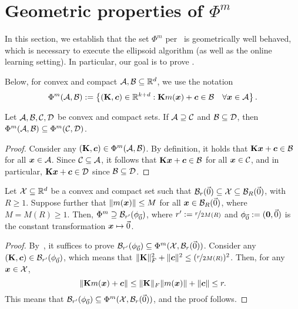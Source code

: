 \section{Geometric properties of $\Phi^m$}
\label{sec:wellbounded}

In this section, we establish that the set $\Phi^m$ per~ is geometrically well behaved, which is necessary to execute the ellipsoid algorithm (as well as the online learning setting). In particular, our goal is to prove .

Below, for convex and compact ${\mathcal{A}}, {\mathcal{B}} \subseteq \mathbb R^d$, we use the notation 
\begin{equation}
    \Phi^m({\mathcal{A}}, {\mathcal{B}}) := \left\{ ({\mathbf{K}}, \bm{c}) \in \mathbb R^{k + d} : {\mathbf{K}} m({\bm{x}}) + \bm{c} \in {\mathcal{B}} \quad \forall {\bm{x}} \in {\mathcal{A}} \right\}.
\end{equation}

\begin{lemma}
    \label{lemma:trivial}
    Let ${\mathcal{A}}, {\mathcal{B}}, {\mathcal{C}}, {\mathcal{D}}$ be convex and compact sets. If ${\mathcal{A}} \supseteq {\mathcal{C}}$ and ${\mathcal{B}} \subseteq {\mathcal{D}}$, then $\Phi^m({\mathcal{A}}, {\mathcal{B}}) \subseteq \Phi^m({\mathcal{C}}, {\mathcal{D}})$.
\end{lemma}

\begin{proof}
    Consider any $({\mathbf{K}}, \bm{c}) \in \Phi^m({\mathcal{A}}, {\mathcal{B}})$. By definition, it holds that ${\mathbf{K}} {\bm{x}} + \bm{c} \in {\mathcal{B}}$ for all ${\bm{x}} \in {\mathcal{A}}$. Since ${\mathcal{C}} \subseteq {\mathcal{A}}$, it follows that ${\mathbf{K}} {\bm{x}} + \bm{c} \in {\mathcal{B}}$ for all ${\bm{x}} \in {\mathcal{C}}$, and in particular, ${\mathbf{K}} {\bm{x}} + \bm{c} \in {\mathcal{D}}$ since ${\mathcal{B}} \subseteq {\mathcal{D}}$.
\end{proof}

\begin{lemma}
    \label{lemma:boundM}
    Let ${\mathcal{X}} \subseteq \mathbb R^d$ be a convex and compact set such that ${\mathcal{B}}_r(\vec{0}) \subseteq {\mathcal{X}} \subseteq {\mathcal{B}}_R(\vec{0})$, with $R \geq 1$. Suppose further that $\|m({\bm{x}})\| \leq M$ for all ${\bm{x}} \in {\mathcal{B}}_R(\vec{0})$, where $M = M(R) \geq 1$. Then, $\Phi^m \supseteq {\mathcal{B}}_{r'}(\phi_{\vec{0}})$, where $r' := \nicefrac{r}{2M(R)}$ and $\phi_{\vec{0}} := (\mathbf{0}, \vec{0})$ is the constant transformation ${\bm{x}} \mapsto \vec{0}$.
\end{lemma}

\begin{proof}
    By~, it suffices to prove ${\mathcal{B}}_{r'}(\phi_{\vec{0}}) \subseteq \Phi^m({\mathcal{X}}, {\mathcal{B}}_r(\vec{0}))$. Consider any $({\mathbf{K}}, \bm{c}) \in {\mathcal{B}}_{r'}(\phi_{\vec{0}})$, which means that $\| {\mathbf{K}} \|^2_F + \|\bm{c} \|^2 \leq ( \nicefrac{r}{2M(R)})^2$. Then, for any ${\bm{x}} \in {\mathcal{X}}$,
    \begin{equation}
        \| {\mathbf{K}} m({\bm{x}}) + \bm{c} \| \leq \| {\mathbf{K}} \|_F \|m({\bm{x}})\| + \|\bm{c}  \| \leq r.
    \end{equation}
    This means that ${\mathcal{B}}_{r'}(\phi_{\vec{0}}) \subseteq \Phi^m({\mathcal{X}}, {\mathcal{B}}_r(\vec{0}))$, and the proof follows.
\end{proof}

